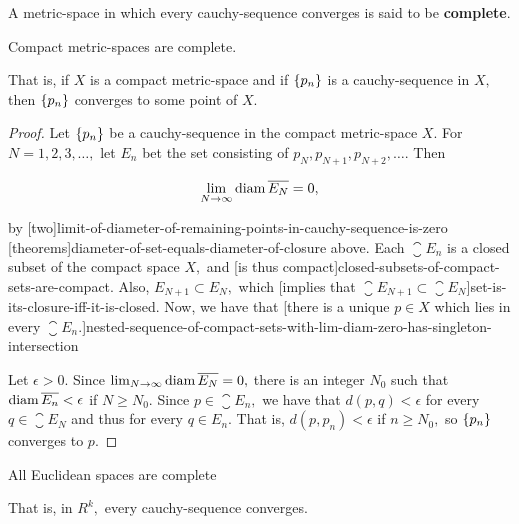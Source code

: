 \documentclass{article}
\begin{document}
\begin{definition}[Complete]
A \@{metric-space} in which every \@{cauchy-sequence} \@{converges} is said to be \textbf{complete}.
\end{definition}

\begin{theorem}\label{compact-metric-spaces-are-complete}
\@{Compact} \@{metric-spaces} are \@{complete}.

That is, if $X$ is a \@{compact} \@{metric-space} and if $\left\{ p_n \right\}$ is a \@{cauchy-sequence} in $X,$ then $\left\{ p_n \right\}$ \@{converges} to some point of $X.$
\end{theorem}

\begin{proof}
Let $\left\{ p_n \right\}$ be a \@{cauchy-sequence} in the \@{compact} \@{metric-space} $X.$ For $N = 1, 2, 3, \dots,$ let $E_n$  bet the set consisting of $p_{N}, p_{N+1}, p_{N+2}, \dots.$ Then

\[ \lim_{N \to \infty}{\operatorname{diam}{\overline{E_N}}}= 0, \]

by \@[two]{limit-of-diameter-of-remaining-points-in-cauchy-sequence-is-zero} \@[theorems]{diameter-of-set-equals-diameter-of-closure} above. Each $\closure{E_n}$ is a \@{closed} \@{subset} of the \@{compact} space $X,$ and \@[is thus compact]{closed-subsets-of-compact-sets-are-compact}. Also, $E_{N+1} \subset E_{N},$ which \@[implies that $\closure{E_{N+1}} \subset \closure{E_{N}}$]{set-is-its-closure-iff-it-is-closed}. Now, we have that \@[there is a unique $p \in X$ which lies in every $\closure{E_n}.$]{nested-sequence-of-compact-sets-with-lim-diam-zero-has-singleton-intersection}

Let $\epsilon > 0.$ Since $\lim_{N \to \infty}{\operatorname{diam}{\overline{E_N}}}= 0,$ there is an \@{integer} $N_0$ such that $\operatorname{diam}{\overline{E_n}} < \epsilon$ if $N \geq N_0.$ Since $p \in \closure{E_n},$ we have that $d(p, q) < \epsilon$ for every $q \in \closure{E_N}$ and thus for every $q \in E_n.$ That is, $d(p, p_n) < \epsilon$ if $n \geq N_0,$ so $\left\{ p_n \right\}$ converges to $p.$
\end{proof}

\begin{theorem}\label{euclidean-spaces-are-complete}
All Euclidean spaces are \@{complete}

That is, in $R^k,$ every \@{cauchy-sequence} \@{converges}.
\end{theorem}
\end{document}
